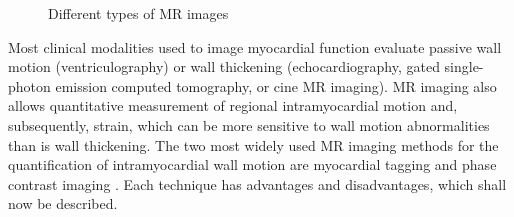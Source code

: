 \begin{figure}
     \centering
     \caption{Different types of MR images}
     \label{fig:mrtypes}
\end{figure}

Most clinical modalities used to image myocardial function evaluate passive wall motion (ventriculography) or wall thickening (echocardiography, gated single-photon emission computed tomography, or cine MR imaging). MR imaging also allows quantitative measurement of regional intramyocardial motion and, subsequently, strain, which can be more sensitive to wall motion abnormalities than is wall thickening. The two most widely used MR imaging methods for the quantification of intramyocardial wall motion are myocardial tagging \cite{mrtag} and phase contrast imaging \cite{mrphase}. Each technique has advantages and disadvantages, which shall now be described.


